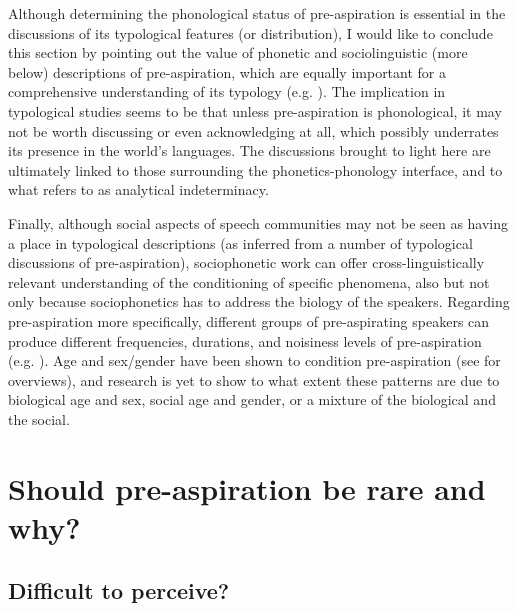 \documentclass[output=paper]{langscibook}
\begin{document}
Although determining the phonological status of pre\hyp aspiration is essential in the discussions of its typological features (or distribution), I would like to conclude this section by pointing out the value of phonetic and sociolinguistic (more below) descriptions of pre-aspiration, which are equally important for a comprehensive understanding of its typology (e.g. \citealt{ChoLadefoged1999, MoisikEtAl2022, MorrisHejná2020}). The implication in typological studies seems to be that unless pre\hyp aspiration is phonological, it may not be worth discussing or even acknowledging at all, which possibly underrates its presence in the world’s languages. The discussions brought to light here are ultimately linked to those surrounding the phonetics-phonology interface, and to what  refers to as analytical indeterminacy.

Finally, although social aspects of speech communities may not be seen as having a place in typological descriptions (as inferred from a number of typological discussions of pre-aspiration), sociophonetic work can offer cross-linguistically relevant understanding of the conditioning of specific phenomena, also but not only because sociophonetics has to address the biology of the speakers. Regarding pre\hyp aspiration more specifically, different groups of pre-aspirating speakers can produce different frequencies, durations, and noisiness levels of pre\hyp aspiration (e.g. \citealt{Clayton2017, Hejná2021, HejnáEtAl2020, HejnáEtAl2021, Morris2010, MorrisHejná2020, NanceStuart-Smith2013}). Age and sex/gender have been shown to condition pre\hyp aspiration (see \citealt{Hejná2015, MorrisHejná2020} for overviews), and research is yet to show to what extent these patterns are due to biological age and sex, social age and gender, or a mixture of the biological and the social.

\section{Should pre\hyp aspiration be rare and why?}\label{sec:hejna:4}
\subsection{Difficult to perceive?} \label{sec:hejna:4.1}
\end{document}
